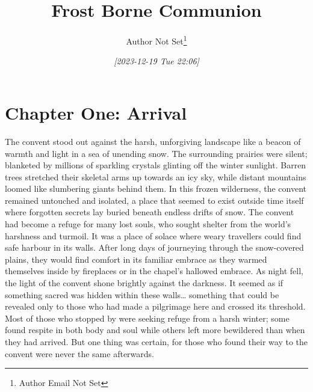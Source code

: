 \documentclass[11pt]{article}
\author{Author Not Set\thanks{Author Email Not Set}}
\date{\textit{[2023-12-19 Tue 22:06]}}
\title{Frost Borne Communion}
\begin{document}
\maketitle
\tableofcontents

\section{Chapter One: Arrival}
\label{sec:org2e8899d}
The convent stood out against the harsh, unforgiving landscape like a beacon of warmth and light in a sea of unending snow. The surrounding prairies were silent; blanketed by millions of sparkling crystals glinting off the winter sunlight. Barren trees stretched their skeletal arms up towards an icy sky, while distant mountains loomed like slumbering giants behind them. In this frozen wilderness, the convent remained untouched and isolated, a place that seemed to exist outside time itself where forgotten secrets lay buried beneath endless drifts of snow.
The convent had become a refuge for many lost souls, who sought shelter from the world's harshness and turmoil. It was a place of solace where weary travellers could find safe harbour in its walls. After long days of journeying through the snow-covered plains, they would find comfort in its familiar embrace as they warmed themselves inside by fireplaces or in the chapel's hallowed embrace.
As night fell, the light of the convent shone brightly against the darkness. It seemed as if something sacred was hidden within these walls\ldots{} something that could be revealed only to those who had made a pilgrimage here and crossed its threshold.
Most of those who stopped by were seeking refuge from a harsh winter; some found respite in both body and soul while others left more bewildered than when they had arrived. But one thing was certain, for those who found their way to the convent were never the same afterwards.
\end{document}
